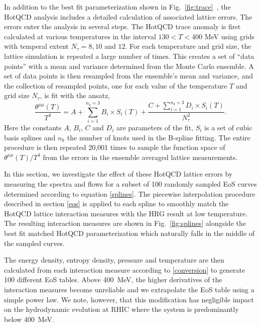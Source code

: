 \documentclass[aps,prc,reprint,amsmath,nofootinbib,superscriptaddress]{revtex4-1}
\begin{document}
In addition to the best fit parameterization shown in Fig.~\ref{fig:trace}~, the HotQCD analysis includes a detailed calculation of associated lattice errors. The errors enter the analysis in several steps.
The HotQCD trace anomaly is first calculated at various temperatures in the interval $130 < T < 400$ MeV using grids with temperal extent $N_\tau = 8,10$ and $12$.
For each temperature and grid size, the lattice simulation is repeated a large number of times. 
This creates a set of ``data points'' with a mean and variance determined from the Monte Carlo ensemble. 
A set of data points is then resampled from the ensemble's mean and variance, and the collection of resampled points, one for each value of the temperature $T$ and grid size $N_\tau$, is fit with the ansatz,
\begin{equation}
 \label{splines}
 \frac{\theta^{\mu\mu}(T)}{T^4} = A + \sum\limits_{i=1}^{n_k=3} B_i \times S_i(T) + \frac{C + \sum_{i=1}^{n_k + 3} D_i \times S_i(T)}{N_\tau^2}.
\end{equation}
Here the constants $A$, $B_i$, $C$ and $D_i$ are parameters of the fit, $S_i$ is a set of cubic basis splines and $n_k$ the number of knots used in the B-spline fitting. 
The entire procedure is then repeated 20,001 times to sample the function space of $\theta^{\mu\mu}(T)/T^4$ from the errors in the ensemble averaged lattice measurements.

In this section, we investigate the effect of these HotQCD lattice errors by measuring the spectra and flows for a subset of 100 randomly sampled EoS curves determined according to equation \eqref{splines}.
The piecewise interpolation procedure described in section \ref{eos} is applied to each spline to smoothly match the HotQCD lattice interaction measures with the HRG result at low temperature. 
The resulting interaction measures are shown in Fig.~\ref{fig:splines} alongside the best fit matched HotQCD parameterization which naturally falls in the middle of the sampled curves.  

The energy density, entropy density, pressure and temperature are then calculated from each interaction measure according to \eqref{conversion} to generate 100 different EoS tables. 
Above 400~MeV, the higher derivatives of the interaction measures become unreliable and we extrapolate the EoS table using a simple power law. 
We note, however, that this modification has negligible impact on the hydrodynamic evolution at RHIC where the system is predominantly below 400~MeV.
\end{document}
